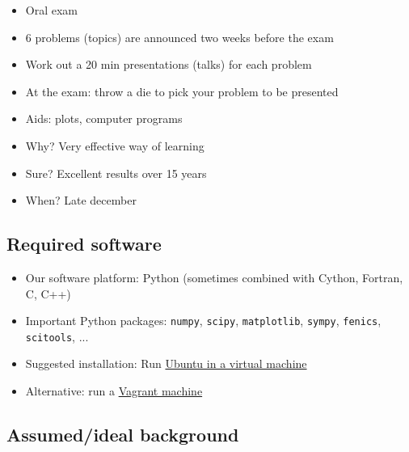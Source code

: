 \documentclass[%
oneside,                 %
final,                   %
10pt]{article}
\begin{document}
\begin{itemize}
 \item Oral exam

 \item 6 problems (topics) are announced two weeks before the exam

 \item Work out a 20 min presentations (talks) for each problem

 \item At the exam: throw a die to pick your problem to be presented

 \item Aids: plots, computer programs

 \item Why? Very effective way of learning

 \item Sure? Excellent results over 15 years

 \item When? Late december
\end{itemize}

\noindent

\subsection*{Required software}

\begin{itemize}
 \item Our software platform: Python (sometimes combined with Cython,
   Fortran, C, C++)

 \item Important Python packages: \texttt{numpy}, \texttt{scipy}, \texttt{matplotlib},
   \texttt{sympy}, \texttt{fenics}, \texttt{scitools}, ...

 \item Suggested installation: Run \href{{http://hplgit.github.io/edu/accesspy/._accesspy_uio005.html}}{Ubuntu in a virtual machine}

 \item Alternative: run a \href{{http://hplgit.github.io/edu/accesspy/._accesspy_uio007.html}}{Vagrant machine}
\end{itemize}

\noindent
\subsection*{Assumed/ideal background}
\end{document}
